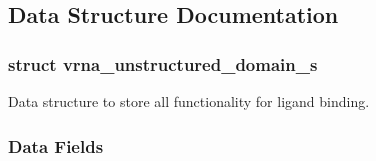 \subsection{Data Structure Documentation}
\label{structvrna__unstructured__domain__s}
\subsubsection{struct vrna\+\_\+unstructured\+\_\+domain\+\_\+s}
Data structure to store all functionality for ligand binding. \subsubsection*{Data Fields}
